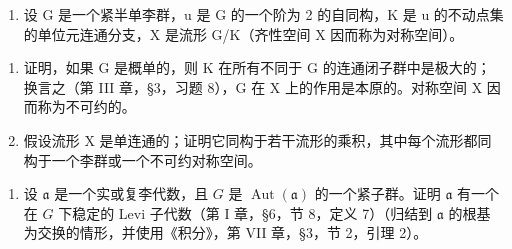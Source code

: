 \begin{enumerate}
\def\labelenumi{\arabic{enumi})}
\setcounter{enumi}{7}
\tightlist
\item
  设 G 是一个紧半单李群，u 是 G 的一个阶为 2 的自同构，K 是 u 的不动点集的单位元连通分支，X 是流形 G/K（齐性空间 X 因而称为对称空间）。
\end{enumerate}

\begin{enumerate}
\def\labelenumi{\alph{enumi})}
\item
  证明，如果 G 是概单的，则 K 在所有不同于 G 的连通闭子群中是极大的；换言之（第 III 章，§3，习题 8），G 在 X 上的作用是本原的。对称空间 X 因而称为不可约的。
\item
  假设流形 X 是单连通的；证明它同构于若干流形的乘积，其中每个流形都同构于一个李群或一个不可约对称空间。
\end{enumerate}

\begin{enumerate}
\def\labelenumi{\arabic{enumi})}
\setcounter{enumi}{8}
\tightlist
\item
  设 \(\mathfrak{a}\) 是一个实或复李代数，且 \(G\) 是 \(\operatorname{Aut}(\mathfrak{a})\) 的一个紧子群。证明 \(\mathfrak{a}\) 有一个在 \(G\) 下稳定的 Levi 子代数（第 I 章，§6，节 8，定义 7）（归结到 \(\mathfrak{a}\) 的根基为交换的情形，并使用《积分》，第 VII 章，§3，节 2，引理 2）。
\end{enumerate}

